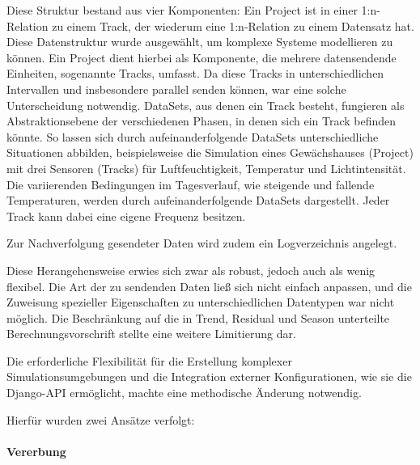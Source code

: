Diese Struktur bestand aus vier Komponenten: Ein Project ist in einer 1:n-Relation zu einem Track, der wiederum eine 1:n-Relation zu einem Datensatz hat. 
Diese Datenstruktur wurde ausgewählt, um komplexe Systeme modellieren zu können. Ein Project dient hierbei als Komponente, die mehrere datensendende Einheiten, 
sogenannte Tracks, umfasst. Da diese Tracks in unterschiedlichen Intervallen und insbesondere parallel senden können, war eine solche Unterscheidung notwendig. 
DataSets, aus denen ein Track besteht, fungieren als Abstraktionsebene der verschiedenen Phasen, in denen sich ein Track befinden könnte. So lassen sich durch aufeinanderfolgende DataSets unterschiedliche Situationen abbilden, 
beispielsweise die Simulation eines Gewächshauses (Project) mit drei Sensoren (Tracks) für Luftfeuchtigkeit, Temperatur und Lichtintensität. Die variierenden Bedingungen im Tagesverlauf, wie steigende und fallende 
Temperaturen, werden durch aufeinanderfolgende DataSets dargestellt. Jeder Track kann dabei eine eigene Frequenz besitzen.

Zur Nachverfolgung gesendeter Daten wird zudem ein Logverzeichnis angelegt.

Diese Herangehensweise erwies sich zwar als robust, jedoch auch als wenig flexibel. Die Art der zu sendenden Daten ließ sich nicht einfach anpassen, und die Zuweisung spezieller Eigenschaften zu unterschiedlichen 
Datentypen war nicht möglich. Die Beschränkung auf die in Trend, Residual und Season unterteilte Berechnungsvorschrift stellte eine weitere Limitierung dar.

Die erforderliche Flexibilität für die Erstellung komplexer Simulationsumgebungen und die Integration externer Konfigurationen, wie sie die Django-API ermöglicht, machte eine methodische Änderung notwendig. 

Hierfür wurden zwei Ansätze verfolgt:

\paragraph{Vererbung} 

